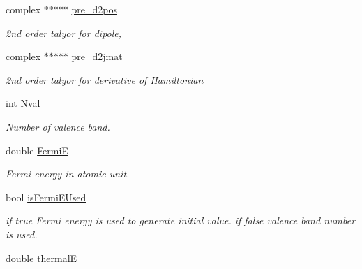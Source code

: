 \begin{DoxyCompactItemize}
complex $\ast$$\ast$$\ast$$\ast$$\ast$ \hyperlink{class_tight_binding_a0d678c12cf6e47feb987a98df21704ac}{pre\+\_\+d2pos}
\begin{DoxyCompactList}\small\item\em 2nd order talyor for dipole, \end{DoxyCompactList}\item 
\mbox{\label{class_tight_binding_ae64337a0bcfdc9ad8a8f1fd5cac3a0ad}} 
complex $\ast$$\ast$$\ast$$\ast$$\ast$ \hyperlink{class_tight_binding_ae64337a0bcfdc9ad8a8f1fd5cac3a0ad}{pre\+\_\+d2jmat}
\begin{DoxyCompactList}\small\item\em 2nd order talyor for derivative of Hamiltonian \end{DoxyCompactList}\item 
\mbox{\label{class_tight_binding_a51237a9dd92fade443866bb0705b0dc2}} 
int \hyperlink{class_tight_binding_a51237a9dd92fade443866bb0705b0dc2}{Nval}
\begin{DoxyCompactList}\small\item\em Number of valence band. \end{DoxyCompactList}\item 
\mbox{\label{class_tight_binding_a253367f714155723bdac47fefd0a6d48}} 
double \hyperlink{class_tight_binding_a253367f714155723bdac47fefd0a6d48}{FermiE}
\begin{DoxyCompactList}\small\item\em Fermi energy in atomic unit. \end{DoxyCompactList}\item 
\mbox{\label{class_tight_binding_a8f8284119d4be9f4409d520669cb142c}} 
bool \hyperlink{class_tight_binding_a8f8284119d4be9f4409d520669cb142c}{is\+Fermi\+E\+Used}
\begin{DoxyCompactList}\small\item\em if true Fermi energy is used to generate initial value. if false valence band number is used. \end{DoxyCompactList}\item 
\mbox{\label{class_tight_binding_a08472120b01aae1ccf704543ae4cee7b}} 
double \hyperlink{class_tight_binding_a08472120b01aae1ccf704543ae4cee7b}{thermalE}

\end{DoxyCompactItemize}
